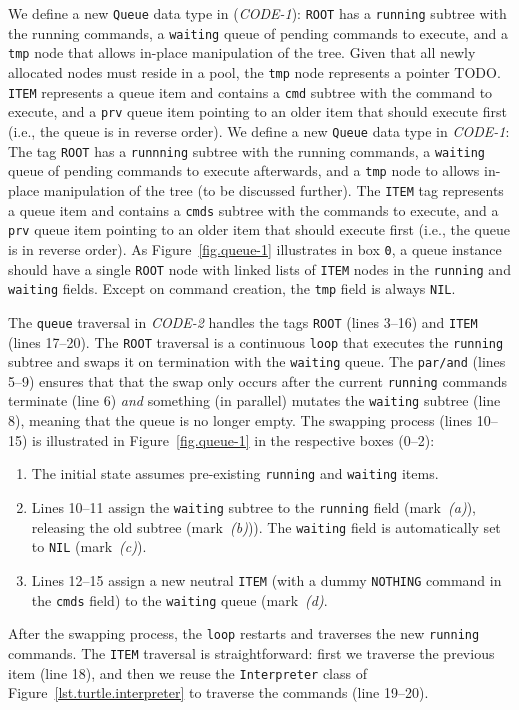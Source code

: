\documentclass{acm_proc_article-sp}
\newcommand{\code}[1] {{\small{\texttt{#1}}}}
\begin{document}
We define a new \code{Queue} data type in (\emph{CODE-1}):
\code{ROOT} has a \code{running} subtree with the running commands, a 
\code{waiting} queue of pending commands to execute, and a \code{tmp} node that 
allows in-place manipulation of the tree.
Given that all newly allocated nodes must reside in a pool, the \code{tmp} node 
represents a pointer TODO.
\code{ITEM} represents a queue item and contains a \code{cmd} subtree with the 
command to execute, and a \code{prv} queue item pointing to an older item that 
should execute first (i.e., the queue is in reverse order).
%
We define a new \code{Queue} data type in \emph{CODE-1}:
The tag \code{ROOT} has a \code{runnning} subtree with the running commands, a 
\code{waiting} queue of pending commands to execute afterwards, and a 
\code{tmp} node to allows in-place manipulation of the tree (to be discussed 
further).
%
The \code{ITEM} tag represents a queue item and contains a \code{cmds} subtree 
with the commands to execute, and a \code{prv} queue item pointing to an older 
item that should execute first (i.e., the queue is in reverse order).
%
As Figure~\ref{fig.queue-1} illustrates in box \code{0}, a queue instance 
should have a single \code{ROOT} node with linked lists of \code{ITEM} nodes in 
the \code{running} and \code{waiting} fields.
Except on command creation, the \code{tmp} field is always \code{NIL}.

The \code{queue} traversal in \emph{CODE-2} handles the tags \code{ROOT} (lines 
3--16) and \code{ITEM} (lines 17--20).
%
The \code{ROOT} traversal is a continuous \code{loop} that executes the 
\code{running} subtree and swaps it on termination with the \code{waiting} 
queue.
The \code{par/and} (lines 5--9) ensures that that the swap only occurs after 
the current \code{running} commands terminate (line 6) \emph{and} something (in 
parallel) mutates the \code{waiting} subtree (line 8), meaning that the queue 
is no longer empty.
The swapping process (lines 10--15) is illustrated in Figure~\ref{fig.queue-1} 
in the respective boxes (0--2):
%
\begin{enumerate}[start=0]
%
\item The initial state assumes pre-existing \code{running} and \code{waiting} 
items.
\item Lines 10--11 assign the \code{waiting} subtree to the \code{running} 
field (mark~\emph{(a)}), releasing the old subtree (mark~\emph{(b)})).
The \code{waiting} field is automatically set to \code{NIL} (mark~\emph{(c)}).
%
\item Lines 12--15 assign a new neutral \code{ITEM} (with a dummy 
\code{NOTHING} command in the \code{cmds} field) to the \code{waiting} queue 
(mark~\emph{(d)}.
%
\end{enumerate}
%
After the swapping process, the \code{loop} restarts and traverses the new 
\code{running} commands.
%
The \code{ITEM} traversal is straightforward:
first we traverse the previous item (line 18), and then we reuse the 
\code{Interpreter} class of Figure~\ref{lst.turtle.interpreter} to traverse the 
commands (line 19--20).
\end{document}
